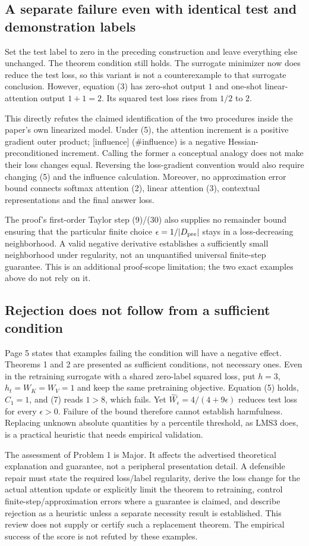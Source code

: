 \documentclass[10pt]{article}
\begin{document}
\subsection*{A separate failure even with identical test and demonstration labels}
Set the test label to zero in the preceding construction and leave everything else unchanged. The theorem condition still holds. The surrogate minimizer now does reduce the test loss, so this variant is not a counterexample to that surrogate conclusion. However, equation (3) has zero-shot output \(1\) and one-shot linear-attention output \(1+1=2\). Its squared test loss rises from \(1/2\) to \(2\).\par
This directly refutes the claimed identification of the two procedures inside the paper’s own linearized model. Under (5), the attention increment is a positive gradient outer product; [influence] (\#influence) is a negative Hessian-preconditioned increment. Calling the former a conceptual analogy does not make their loss changes equal. Reversing the loss-gradient convention would also require changing (5) and the influence calculation. Moreover, no approximation error bound connects softmax attention (2), linear attention (3), contextual representations and the final answer loss.\par
The proof’s first-order Taylor step (9)/(30) also supplies no remainder bound ensuring that the particular finite choice \(\epsilon=1/|D_{\rm pre}|\) stays in a loss-decreasing neighborhood. A valid negative derivative establishes a sufficiently small neighborhood under regularity, not an unquantified universal finite-step guarantee. This is an additional proof-scope limitation; the two exact examples above do not rely on it.\par
\subsection*{Rejection does not follow from a sufficient condition}
Page 5 states that examples failing the condition will have a negative effect. Theorems 1 and 2 are presented as sufficient conditions, not necessary ones. Even in the retraining surrogate with a shared zero-label squared loss, put \(h=3\), \(h_t=W_K=W_V=1\) and keep the same pretraining objective. Equation (5) holds, \(C_1=1\), and (7) reads \(1>8\), which fails. Yet \(\widehat W_\epsilon=4/(4+9\epsilon)\) reduces test loss for every \(\epsilon>0\). Failure of the bound therefore cannot establish harmfulness. Replacing unknown absolute quantities by a percentile threshold, as LMS3 does, is a practical heuristic that needs empirical validation.\par
The assessment of Problem 1 is Major. It affects the advertised theoretical explanation and guarantee, not a peripheral presentation detail. A defensible repair must state the required loss/label regularity, derive the loss change for the actual attention update or explicitly limit the theorem to retraining, control finite-step/approximation errors where a guarantee is claimed, and describe rejection as a heuristic unless a separate necessity result is established. This review does not supply or certify such a replacement theorem. The empirical success of the score is not refuted by these examples.\par
\end{document}
